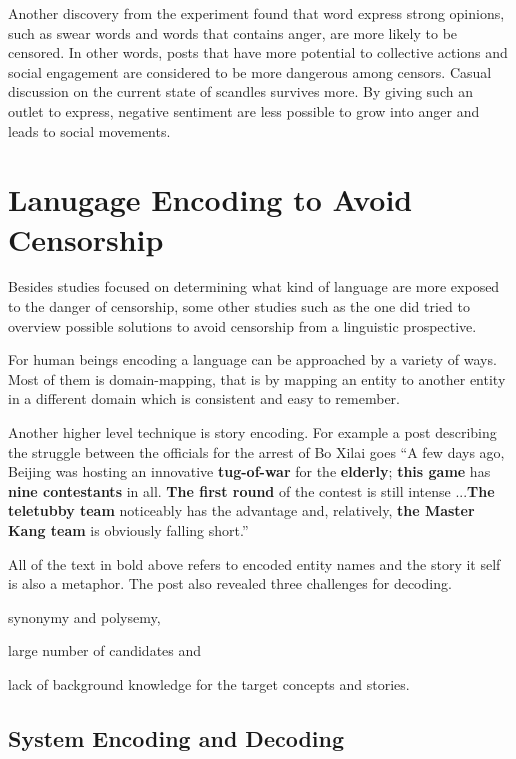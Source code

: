 \documentclass[11pt]{article} %
\begin{document}
Another discovery from the experiment found that word express strong opinions, such as swear words and words that contains anger, are more likely to be censored. In other words, posts that have more potential to collective actions and social engagement are considered to be more dangerous among censors. Casual discussion on the current state of scandles survives more. By giving such an outlet to express, negative sentiment are less possible to grow into anger and leads to social movements.

\section{Lanugage Encoding to Avoid Censorship}

Besides studies focused on determining what kind of language are more exposed to the danger of censorship, some other studies such as the one \cite{ji2018creative} did tried to overview possible solutions to avoid censorship from a linguistic prospective.

For human beings encoding a language can be approached by a variety of ways. Most of them is domain-mapping, that is by mapping an entity to another entity in a different domain which is consistent and easy to remember. 

Another higher level technique is story encoding. For example a post describing the struggle between the officials for the arrest of Bo Xilai goes ``A few days ago, Beijing was hosting an innovative \textbf{tug-of-war} for the \textbf{elderly}; \textbf{this game} has \textbf{nine contestants} in all. \textbf{The first round} of the contest is still intense ...\textbf{The teletubby team} noticeably has the advantage and, relatively, \textbf{the Master Kang team} is obviously falling short.''

All of the text in bold above refers to encoded entity names and the story it self is also a metaphor. The post also revealed three challenges for decoding.
\begin {enumerate*}[label=\emph{\alph*})]
\item synonymy and polysemy,  \item large number of candidates and \item lack of background knowledge for the target concepts and stories.
\end {enumerate*}

\subsection{System Encoding and Decoding}
\end{document}
